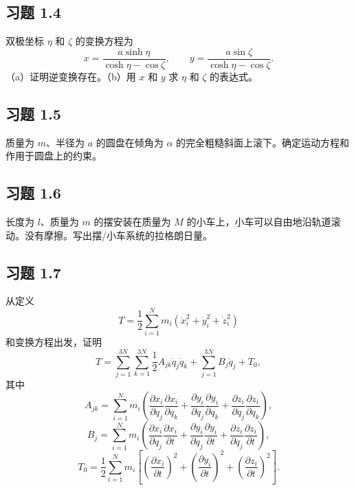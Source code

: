\subsection*{习题 1.4}
双极坐标 $\eta$ 和 $\zeta$ 的变换方程为
$$
x = \frac{a\sinh\eta}{\cosh\eta - \cos\zeta}, \qquad y = \frac{a\sin\zeta}{\cosh\eta - \cos\zeta}.
$$
（a）证明逆变换存在。（b）用 $x$ 和 $y$ 求 $\eta$ 和 $\zeta$ 的表达式。

\subsection*{习题 1.5}
质量为 $m$、半径为 $a$ 的圆盘在倾角为 $\alpha$ 的完全粗糙斜面上滚下。确定运动方程和作用于圆盘上的约束。

\subsection*{习题 1.6}
长度为 $l$、质量为 $m$ 的摆安装在质量为 $M$ 的小车上，小车可以自由地沿轨道滚动。没有摩擦。写出摆/小车系统的拉格朗日量。

\subsection*{习题 1.7}
从定义
$$
T = \frac{1}{2}\sum_{i=1}^{N}m_i\left(\dot{x}_i^2 + \dot{y}_i^2 + \dot{z}_i^2\right)
$$
和变换方程出发，证明
$$
T = \sum_{j=1}^{3N}\sum_{k=1}^{3N}\frac{1}{2}A_{jk}\dot{q}_j\dot{q}_k + \sum_{j=1}^{3N}B_j\dot{q}_j + T_0,
$$
其中
$$
A_{jk} = \sum_{i=1}^{N}m_i\left(\frac{\partial x_i}{\partial q_j}\frac{\partial x_i}{\partial q_k} + \frac{\partial y_i}{\partial q_j}\frac{\partial y_i}{\partial q_k} + \frac{\partial z_i}{\partial q_j}\frac{\partial z_i}{\partial q_k}\right),
$$
$$
B_j = \sum_{i=1}^{N}m_i\left(\frac{\partial x_i}{\partial q_j}\frac{\partial x_i}{\partial t} + \frac{\partial y_i}{\partial q_j}\frac{\partial y_i}{\partial t} + \frac{\partial z_i}{\partial q_j}\frac{\partial z_i}{\partial t}\right),
$$
$$
T_0 = \frac{1}{2}\sum_{i=1}^{N}m_i\left[\left(\frac{\partial x_i}{\partial t}\right)^2 + \left(\frac{\partial y_i}{\partial t}\right)^2 + \left(\frac{\partial z_i}{\partial t}\right)^2\right].
$$
